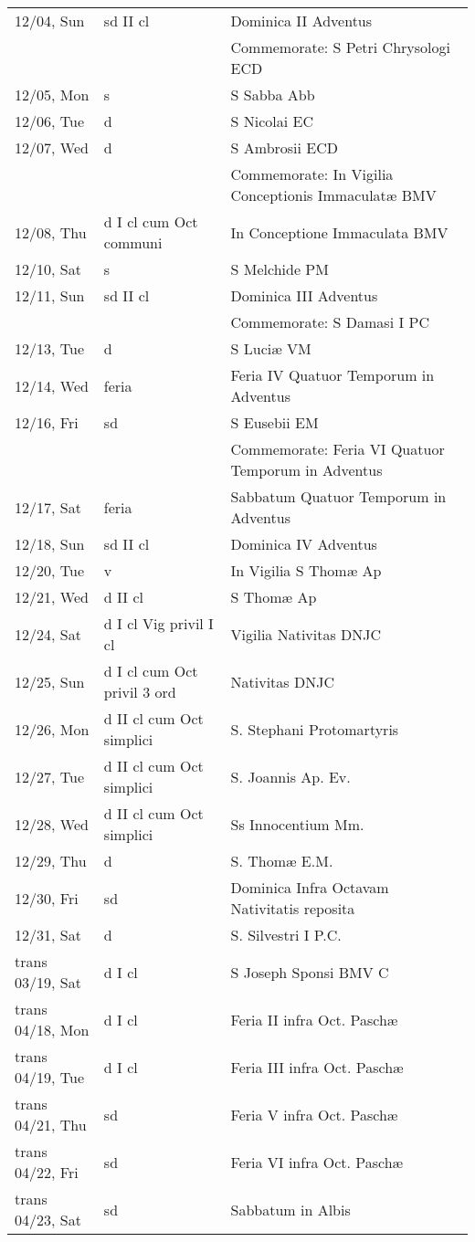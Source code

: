 \documentclass{article}
\begin{document}
\begin{longtable}{ l l l }
12/04, Sun & sd II cl & Dominica II Adventus\\
 & & Commemorate: S Petri Chrysologi ECD\\
12/05, Mon & s & S Sabba Abb\\
12/06, Tue & d & S Nicolai EC\\
12/07, Wed & d & S Ambrosii ECD\\
 & & Commemorate: In Vigilia Conceptionis Immaculatæ BMV\\
12/08, Thu & d I cl cum Oct communi & In Conceptione Immaculata BMV\\
12/10, Sat & s & S Melchide PM\\
12/11, Sun & sd II cl & Dominica III Adventus\\
 & & Commemorate: S Damasi I PC\\
12/13, Tue & d & S Luciæ VM\\
12/14, Wed & feria & Feria IV Quatuor Temporum in Adventus\\
12/16, Fri & sd & S Eusebii EM\\
 & & Commemorate: Feria VI Quatuor Temporum in Adventus\\
12/17, Sat & feria & Sabbatum Quatuor Temporum in Adventus\\
12/18, Sun & sd II cl & Dominica IV Adventus\\
12/20, Tue & v & In Vigilia S Thomæ Ap\\
12/21, Wed & d II cl & S Thomæ Ap\\
12/24, Sat & d I cl Vig privil I cl & Vigilia Nativitas DNJC\\
12/25, Sun & d I cl cum Oct privil 3 ord & Nativitas DNJC\\
12/26, Mon & d II cl cum Oct simplici & S. Stephani Protomartyris\\
12/27, Tue & d II cl cum Oct simplici & S. Joannis Ap. Ev.\\
12/28, Wed & d II cl cum Oct simplici & Ss Innocentium Mm.\\
12/29, Thu & d & S. Thomæ E.M.\\
12/30, Fri & sd & Dominica Infra Octavam Nativitatis reposita\\
12/31, Sat & d & S. Silvestri I P.C.\\
trans 03/19, Sat & d I cl & S Joseph Sponsi BMV C\\
trans 04/18, Mon & d I cl & Feria II infra Oct. Paschæ\\
trans 04/19, Tue & d I cl & Feria III infra Oct. Paschæ\\
trans 04/21, Thu & sd & Feria V infra Oct. Paschæ\\
trans 04/22, Fri & sd & Feria VI infra Oct. Paschæ\\
trans 04/23, Sat & sd & Sabbatum in Albis\\
\end{longtable}
\end{document}
